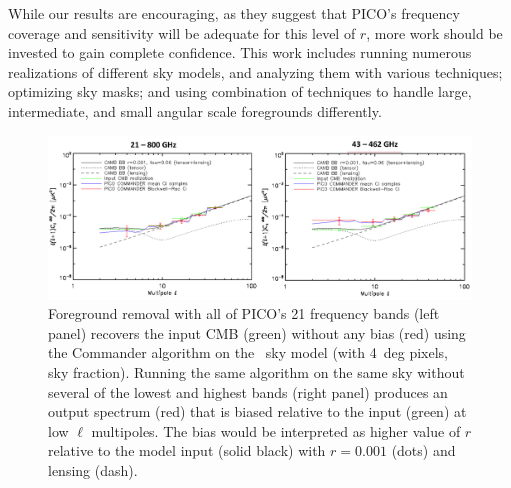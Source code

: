 \documentclass[PICOReport.tex]{subfiles}
\begin{document}
While our results are encouraging, as they suggest that PICO's frequency coverage and sensitivity will be adequate for this level of $r$, more work should be invested to gain complete confidence. This work includes running numerous realizations of different sky models, and analyzing them with various techniques; optimizing sky masks; and using combination of techniques to handle large, intermediate, and small angular scale foregrounds differently. 
\begin{figure}
{\centerline {
\includegraphics[width=4.5in]{images/commander_foregrounds_BB.png} }}
\caption{Foreground removal with all of PICO's 21 frequency bands (left panel) recovers the input CMB (green) without any bias (red) using the Commander algorithm on the \planck\ sky model (with 4~deg pixels,  sky fraction). Running the same algorithm on the same sky without several of the lowest and highest bands (right panel) produces an output spectrum (red) that is biased relative to the input (green) at low $\ell$ multipoles. The bias would be interpreted as higher value of $r$ relative to the model input (solid black) with $r=0.001$ (dots) and lensing (dash). 
\label{fig:commander}}
\vspace{-0.0in}
\end{figure}


\end{document}
